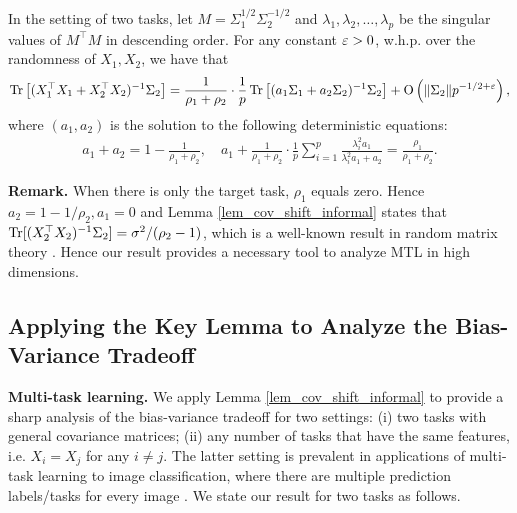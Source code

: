 \begin{lemma}\label{lem_cov_shift_informal}
	In the setting of two tasks, let $M = \Sigma_1^{1/2}\Sigma_2^{-1/2}$ and $\lambda_1, \lambda_2, \dots, \lambda_p$ be the singular values of $M^{\top}M$ in descending order.
	For any constant ${\varepsilon}>0$, w.h.p. over the randomness of $X_1, X_2$, we have that
	\begin{align*}
		\operatorname{Tr}\left[(X_1^{\top}X_1 + X_2^{\top}X_2)^{-1}\Sigma_2\right] = \frac{1}{\rho_1+\rho_2}\cdot \frac1p\operatorname{Tr}\left[ (a_1 \Sigma_1 + a_2\Sigma_2)^{-1} \Sigma_2\right] +\operatorname{O}\left(\|\Sigma_2\| p^{-1/2+\varepsilon}\right),
	\end{align*}
where $(a_1, a_2)$ is the solution to the following deterministic equations:
	\begin{align*}
		a_1 + a_2 = 1- \frac{1}{\rho_1 + \rho_2},\quad a_1 + \frac1{\rho_1 + \rho_2}\cdot \frac{1}{p}\sum_{i=1}^p \frac{\lambda_i^2 a_1}{\lambda_i^2 a_1 + a_2} = \frac{\rho_1}{\rho_1 + \rho_2}.
	\end{align*}
\end{lemma}

\textbf{Remark.} When there is only the target task, $\rho_1$ equals zero.
Hence $a_2 = 1 - 1/ \rho_2, a_1 = 0$ and Lemma \ref{lem_cov_shift_informal} states that $\operatorname{Tr}[(X_2^{\top}X_2)^{-1}\Sigma_2] = \sigma^2 / (\rho_2 - 1)$, which is a well-known result in random matrix theory \cite{S07}.
Hence our result provides a necessary tool to analyze MTL in high dimensions.

\subsection{Applying the Key Lemma to Analyze the Bias-Variance Tradeoff}

\textbf{Multi-task learning.}
We apply Lemma \ref{lem_cov_shift_informal} to provide a sharp analysis of the bias-variance tradeoff for two settings:
(i) two tasks with general covariance matrices;
(ii) any number of tasks that have the same features, i.e. $X_i = X_j$ for any $i\neq j$.
The latter setting is prevalent in applications of multi-task learning to image classification, where there are multiple prediction labels/tasks for every image \cite{chexnet17,EA20}.
We state our result for two tasks as follows.

